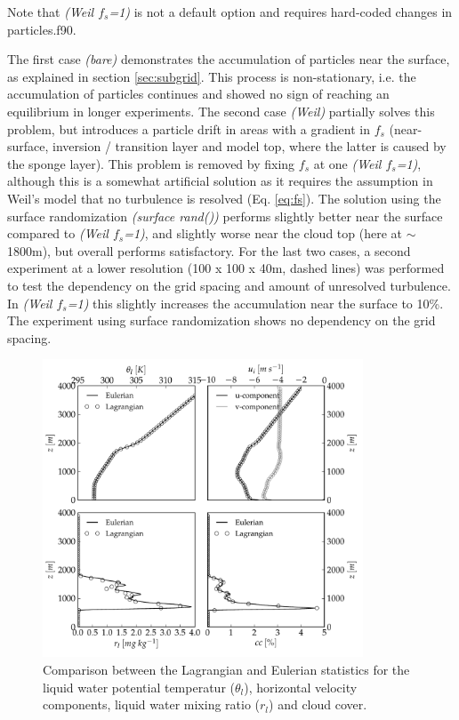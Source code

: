 \documentclass[twoside,a4paper]{report}
\begin{document}
Note that \textit{(Weil $f_s$=1)} is not a default option and requires hard-coded changes in particles.f90.\newline

The first case \textit{(bare)} demonstrates the accumulation of particles near the surface, as explained in section \ref{sec:subgrid}. This process is non-stationary, i.e. the accumulation of particles continues and showed no sign of reaching an equilibrium in longer experiments. The second case \textit{(Weil)} partially solves this problem, but introduces a particle drift in areas with a gradient in $f_s$ (near-surface, inversion / transition layer and model top, where the latter is caused by the sponge layer). This problem is removed by fixing $f_s$ at one \textit{(Weil $f_s$=1)}, although this is a somewhat artificial solution as it requires the assumption in Weil's model that no turbulence is resolved (Eq. \ref{eq:fs}). The solution using the surface randomization \textit{(surface rand())} performs slightly better near the surface compared to \textit{(Weil $f_s$=1)}, and slightly worse near the cloud top (here at $\sim$1800m), but overall performs satisfactory. For the last two cases, a second experiment at a lower resolution (100 x 100 x 40m, dashed lines) was performed to test the dependency on the grid spacing and amount of unresolved turbulence. In \textit{(Weil $f_s$=1)} this slightly increases the accumulation near the surface to 10\%. The experiment using surface randomization shows no dependency on the grid spacing. \newline

\begin{figure}[h]
  \begin{center}
    \includegraphics[width=0.85\textwidth]{figures_LPTM/rico_eul_vs_lagr.pdf}
    \caption{Comparison between the Lagrangian and Eulerian statistics for the liquid water potential temperatur ($\theta_l$), horizontal velocity components, liquid water mixing ratio ($r_l$) and cloud cover.}
    \label{fig:exa_eul_vs_lagr}       %
  \end{center}
\end{figure}
\end{document}
